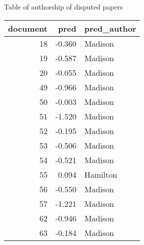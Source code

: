 \documentclass[]{book}
\newenvironment{Shaded}{\begin{snugshade}}{\end{snugshade}}
\newcommand{\KeywordTok}[1]{\textcolor[rgb]{0.13,0.29,0.53}{\textbf{#1}}}
\newcommand{\NormalTok}[1]{#1}
\newcommand{\OperatorTok}[1]{\textcolor[rgb]{0.81,0.36,0.00}{\textbf{#1}}}
\newcommand{\StringTok}[1]{\textcolor[rgb]{0.31,0.60,0.02}{#1}}
\theoremstyle{definition}
\theoremstyle{definition}
\theoremstyle{definition}
\theoremstyle{remark}
\begin{document}
Table of authorship of disputed papers

\begin{Shaded}
\end{Shaded}

\begin{tabular}{r|r|l}
\hline
document & pred & pred\_author\\
\hline
18 & -0.360 & Madison\\
\hline
19 & -0.587 & Madison\\
\hline
20 & -0.055 & Madison\\
\hline
49 & -0.966 & Madison\\
\hline
50 & -0.003 & Madison\\
\hline
51 & -1.520 & Madison\\
\hline
52 & -0.195 & Madison\\
\hline
53 & -0.506 & Madison\\
\hline
54 & -0.521 & Madison\\
\hline
55 & 0.094 & Hamilton\\
\hline
56 & -0.550 & Madison\\
\hline
57 & -1.221 & Madison\\
\hline
62 & -0.946 & Madison\\
\hline
63 & -0.184 & Madison\\
\hline
\end{tabular}
\end{document}
